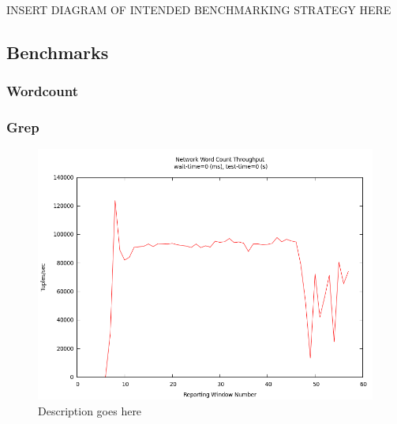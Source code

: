 INSERT DIAGRAM OF INTENDED BENCHMARKING STRATEGY HERE

\subsection{Benchmarks}
\subsubsection{Wordcount}
\subsubsection{Grep}

\begin{figure}[t]
\centering
\includegraphics[width=.8\linewidth]{figures/tput.png}
\caption{Description goes here}
\label{fig:label-me-if-you-want}
\end{figure}
